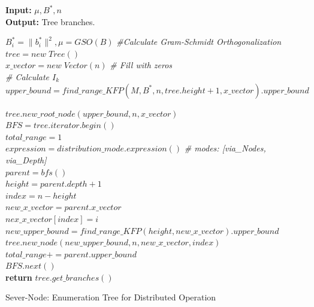 \begin{algorithm}[h] \label{split}
\SetAlgoLined

{\bf Input:} $ μ, Β^*, n $  \\
{\bf Output:} Tree branches. \\

\hfill

$ B^*_i = \| b^*_i \|^2, μ = GSO(B) $ \quad \emph{\#Calculate Gram-Schmidt Orthogonalization} \\

$ tree = new \; Tree() $ \\
$ x\_vector = new \; Vector(n) $  \quad \emph{\# Fill with zeros} \\

\emph{\# Calculate $ I_k $} \\
$ upper\_bound = find\_range\_KFP(M, B^*, n, tree.height+1, x\_vector).upper\_bound $

$ tree.new\_root\_node(upper\_bound, n, x\_vector) $ \\
$ BFS = tree.iterator.begin() $ \\
$ total\_range = 1 $ \\
$ expression = distribution\_mode.expression() $ \emph{\# modes: [via\_Nodes, via\_Depth]}\\
 { 
    $ parent = bfs() $ \\
    $ height = parent.depth + 1 $ \\
    $ index = n - height $ \\
     {
        $ new\_x\_vector = parent.x\_vector $ \\
        $ nex\_x\_vector[index] = i$ \\
        $ new\_upper\_bound = find\_range\_KFP(height, new\_x\_vector).upper\_bound $ \\ 
        $ tree.new\_node(new\_upper\_bound, n, new\_x\_vector, index) $ \\
    } 
    $ total\_range += parent.upper\_bound $ \\
    $ BFS.next() $ \\

} %
\textbf{return} $ tree.get\_branches() $

\caption{Sever-Node: Enumeration Tree for Distributed Operation}
\end{algorithm}





